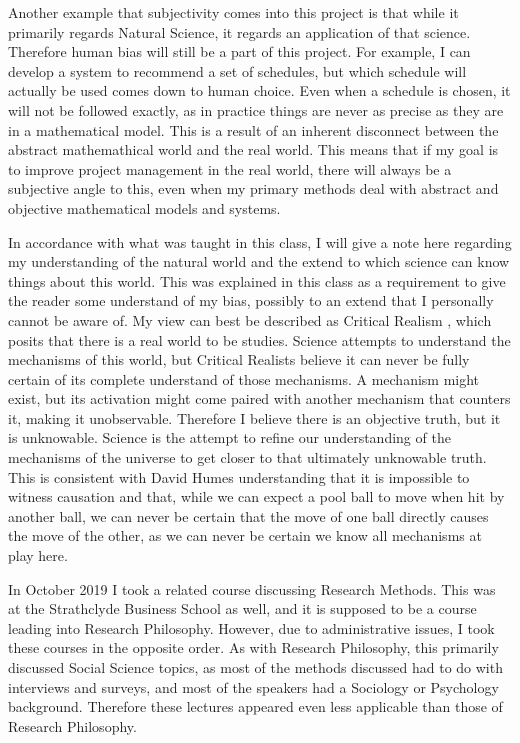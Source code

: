 \documentclass[a4paper,12pt]{article}
\begin{document}
Another example that subjectivity comes into this project is that while it primarily regards Natural Science, it regards an application of that science. Therefore human bias will still be a part of this project. For example, I can develop a system to recommend a set of schedules, but which schedule will actually be used comes down to human choice. Even when a schedule is chosen, it will not be followed exactly, as in practice things are never as precise as they are in a mathematical model. This is a result of an inherent disconnect between the abstract mathemathical world and the real world. This means that if my goal is to improve project management in the real world, there will always be a subjective angle to this, even when my primary methods deal with abstract and objective mathematical models and systems. 

In accordance with what was taught in this class, I will give a note here regarding my understanding of the natural world and the extend to which science can know things about this world. This was explained in this class as a requirement to give the reader some understand of my bias, possibly to an extend that I personally cannot be aware of. My view can best be described as Critical Realism \cite{bhaskar1998critical,archer2013critical}, which posits that there is a real world to be studies. Science attempts to understand the mechanisms of this world, but Critical Realists believe it can never be fully certain of its complete understand of those mechanisms. A mechanism might exist, but its activation might come paired with another mechanism that counters it, making it unobservable. Therefore I believe there is an objective truth, but it is unknowable. Science is the attempt to refine our understanding of the mechanisms of the universe to get closer to that ultimately unknowable truth. This is consistent with David Humes understanding that it is impossible to witness causation \cite{hume2016enquiry} and that, while we can expect a pool ball to move when hit by another ball, we can never be certain that the move of one ball directly causes the move of the other, as we can never be certain we know all mechanisms at play here. 

\bigskip

In October 2019 I took a related course discussing Research Methods. This was at the Strathclyde Business School as well, and it is supposed to be a course leading into Research Philosophy. However, due to administrative issues, I took these courses in the opposite order. As with Research Philosophy, this primarily discussed Social Science topics, as most of the methods discussed had to do with interviews and surveys, and most of the speakers had a Sociology or Psychology background. Therefore these lectures appeared even less applicable than those of Research Philosophy. 
\end{document}
